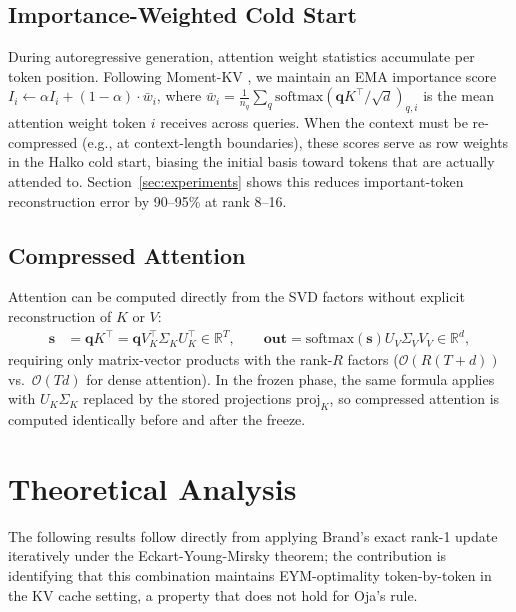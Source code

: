\documentclass{article}
\newcommand{\R}{\mathbb{R}}
\begin{document}
\subsection{Importance-Weighted Cold Start}
\label{sec:importance}

During autoregressive generation, attention weight statistics accumulate per
token position.  Following Moment-KV \citep{momentkv2024}, we maintain an
EMA importance score $I_i \leftarrow \alpha I_i + (1-\alpha) \cdot \bar{w}_i$,
where $\bar{w}_i = \frac{1}{n_q} \sum_{q} \mathrm{softmax}(\mathbf{q} K^\top / \sqrt{d})_{q,i}$
is the mean attention weight token $i$ receives across queries.
When the context must be re-compressed (e.g., at context-length boundaries),
these scores serve as row weights in the Halko cold start, biasing the initial
basis toward tokens that are actually attended to.  Section~\ref{sec:experiments}
shows this reduces important-token reconstruction error by 90--95\% at rank 8--16.

\subsection{Compressed Attention}
\label{sec:attn}

Attention can be computed directly from the SVD factors without explicit
reconstruction of $K$ or $V$:
\begin{align}
  \mathbf{s} &= \mathbf{q} K^\top = \mathbf{q} V_K^\top \Sigma_K U_K^\top
               \in \R^T, \qquad
  \mathbf{out} = \mathrm{softmax}(\mathbf{s}) U_V \Sigma_V V_V \in \R^d,
\end{align}
requiring only matrix-vector products with the rank-$R$ factors
($\mathcal{O}(R(T{+}d))$ vs.\ $\mathcal{O}(Td)$ for dense attention).  In the
frozen phase, the same formula applies with $U_K \Sigma_K$ replaced by the
stored projections $\mathrm{proj}_K$, so compressed attention is computed
identically before and after the freeze.

\section{Theoretical Analysis}
\label{sec:theory}

The following results follow directly from applying Brand's exact rank-1
update iteratively under the Eckart-Young-Mirsky theorem; the contribution
is identifying that this combination maintains EYM-optimality token-by-token
in the KV cache setting, a property that does not hold for Oja's rule.
\end{document}
